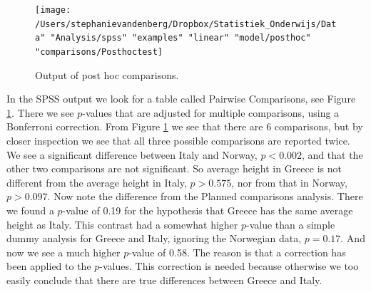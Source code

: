 \documentclass[]{book}\usepackage[]{graphicx}\usepackage[]{color}
\begin{document}
\begin{figure}[h]
    \begin{center}
       \texttt{[image: /Users/stephanievandenberg/Dropbox/Statistiek\_Onderwijs/Data" "Analysis/spss" "examples" "linear" "model/posthoc" "comparisons/Posthoctest]}
    \end{center}
    \caption{Output of post hoc comparisons.}
        \label{fig:posthoctest}
\end{figure}

In the SPSS output we look for a table called Pairwise Comparisons, see Figure \ref{fig:posthoctest}. There we see $p$-values that are adjusted for multiple comparisons, using a Bonferroni correction. From Figure \ref{fig:posthoctest} we see that there are 6 comparisons, but by closer inspection we see that all three possible comparisons are reported twice. We see a significant difference between Italy and Norway, $p<0.002$, and that the other two comparisons are not significant. So average height in Greece is not different from the average height in Italy, $p>0.575$, nor from that in Norway, $p>0.097$.
Now note the difference from the Planned comparisons analysis. There we found a $p$-value of 0.19 for the hypothesis that Greece has the same average height as Italy. This contrast had a somewhat higher $p$-value than a simple dummy analysis for Greece and Italy, ignoring the Norwegian data, $p=0.17$. And now we see a much higher $p$-value of 0.58. The reason is that a correction has been applied to the $p$-values. This correction is needed because otherwise we too easily conclude that there are true differences between Greece and Italy.
\end{document}
